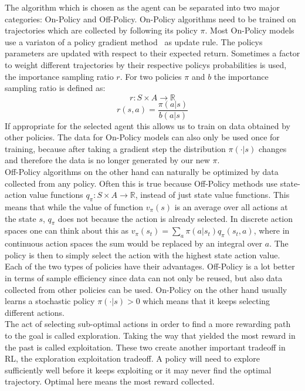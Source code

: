 \documentclass{article}
\begin{document}
\noindent The algorithm which is chosen as the agent can be
separated into two major categories: On-Policy and Off-Policy. On-Policy algorithms need
to be trained on trajectories which are collected by following its policy $\pi$. Most On-Policy
models use a variaton of a policy gradient method~\cite{NIPS1999_464d828b} as update rule. The policys parameters are updated
with respect to their expected return. Sometimes a factor to weight different trajectories by their respective policys probabilities
is used, the importance sampling ratio $r$. For two policies $\pi$ and $b$ the importance sampling ratio is defined as:
\begin{equation}
    r : S\times A \xrightarrow{} \mathbb{R}
\end{equation}
\begin{equation*}
    r(s, a) = \frac{\pi(a|s)}{b(a|s)}
\end{equation*}
If appropriate for the selected agent this allows us to train on data obtained by other policies. The data for
On-Policy models can also only be used once for training, because after taking a gradient step the distribution $\pi(\cdot|s)$ changes
and therefore the data is no longer generated by our new $\pi$.\\
Off-Policy algorithms on the other hand can naturally be optimized
by data collected from any policy. Often this is true because Off-Policy methods use state-action value
functions $q_\pi : S\times A \xrightarrow{} \mathbb{R}$, instead of just state value functions. 
This means that while the value of function $v_\pi(s)$ is an average over all actions at the state $s$, $q_\pi$ does
not because the action is already selected. In discrete action spaces one can think about this as $v_\pi(s_t) = \sum_a \pi(a|s_t)
q_\pi(s_t, a)$, where in continuous action spaces the sum would be replaced by an integral over $a$.
The policy is then to simply select the action with the highest state action value.\\
Each of the two types of policies have their advantages. Off-Policy is a lot better in terms of
sample efficiency since data can not only be reused, but also data collected from other policies can be used.
On-Policy on the other hand usually learns a stochastic policy $\pi(\cdot|s) > 0$ which means that it keeps selecting 
different actions.\\
The act of selecting sub-optimal actions in order to find a more rewarding path to the goal is called exploration.
Taking the way that yielded the most reward in the past is called exploitation. These two create another
important tradeoff in RL, the exploration exploitation tradeoff. A policy will need to explore
sufficiently well before it keeps exploiting or it may never find the optimal trajectory. Optimal here means
the most reward collected.
\end{document}

